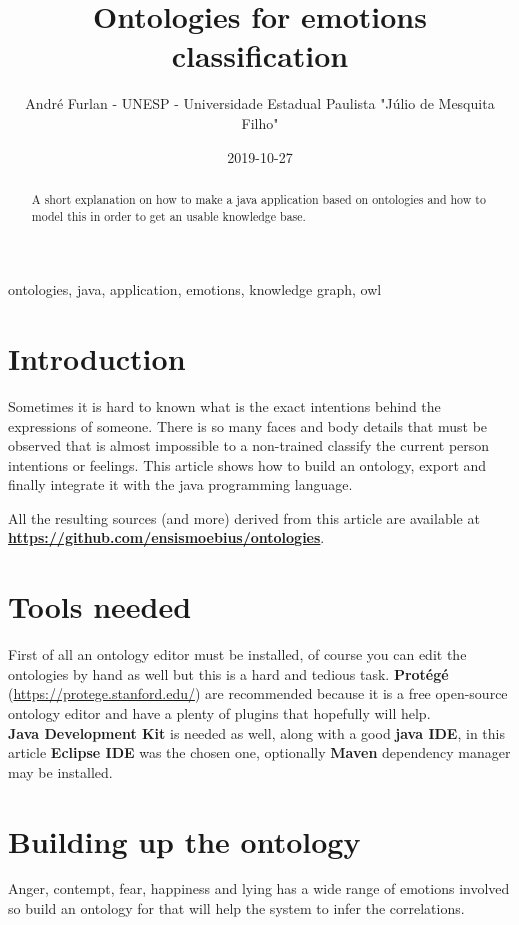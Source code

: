 \documentclass[conference]{IEEEtran}
\begin{document}
\title{Ontologies for emotions classification}
\author{André Furlan - UNESP - Universidade Estadual Paulista "Júlio de Mesquita Filho"}
\date{2019-10-27}
\maketitle

\begin{abstract}
A short explanation on how to make a java application based on ontologies and how to model this in order to get an usable knowledge base.
\end{abstract}

\begin{IEEEkeywords}
ontologies, java, application, emotions, knowledge graph, owl
\end{IEEEkeywords}

\section{Introduction}
	Sometimes it is hard to known what is the exact intentions behind the expressions of someone. There is so many faces and body details that must be observed \cite{ekman2001telling} that is almost impossible to a non-trained classify the current person intentions or feelings. This article shows how to build an ontology, export and finally integrate it with the java programming language.
	
	All the resulting sources (and more) derived from this article are available at \textbf{\url{https://github.com/ensismoebius/ontologies}}.
\section{Tools needed}
	First of all an ontology editor must be installed, of course you can edit the ontologies by hand as well but this is a hard and tedious task. \textbf{Protégé} (\url{https://protege.stanford.edu/}) are recommended because it is a free open-source ontology editor and have a plenty of plugins that hopefully will help.\\
	\textbf{Java Development Kit} is needed as well, along with a good \textbf{java IDE}, in this article \textbf{Eclipse IDE} was the chosen one, optionally \textbf{Maven} dependency manager may be installed.
\section{Building up the ontology}
Anger, contempt, fear, happiness and lying has a wide range of emotions involved \cite{ekman2001telling} \cite{ekman1974detecting} so build an ontology for that will help the system to infer the correlations.
\end{document}
